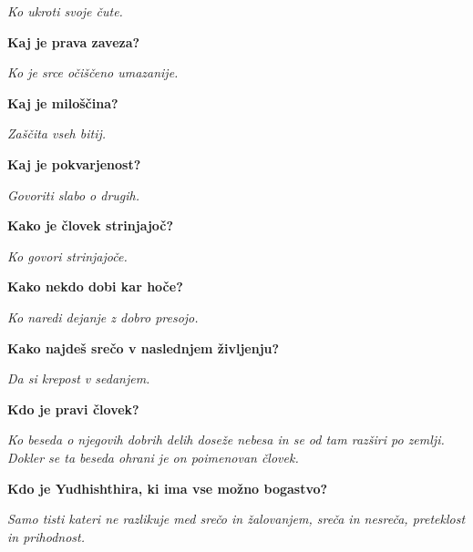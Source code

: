 \textit{Ko ukroti svoje čute.}\medskip 

\textbf{Kaj je prava zaveza?} 

\textit{Ko je srce očiščeno umazanije.}\medskip 

\textbf{Kaj je miloščina?} 

\textit{Zaščita vseh bitij.}\medskip 

\textbf{Kaj je pokvarjenost?} 

\textit{Govoriti slabo o drugih.}\medskip 

\textbf{Kako je človek strinjajoč?} 

\textit{Ko govori strinjajoče.}\medskip 

\textbf{Kako nekdo dobi kar hoče?} 

\textit{Ko naredi dejanje z dobro presojo.}\medskip 

\textbf{Kako najdeš srečo v naslednjem življenju?} 

\textit{Da si krepost v sedanjem.}\medskip 

\textbf{Kdo je pravi človek?} 

\textit{Ko beseda o njegovih dobrih delih doseže nebesa in se od tam razširi po zemlji. Dokler se ta beseda ohrani je on poimenovan človek.}\medskip 

\textbf{Kdo je Yudhishthira, ki ima vse možno bogastvo?} 

\textit{Samo tisti kateri ne razlikuje med srečo in žalovanjem, sreča in nesreča, preteklost in prihodnost.}\medskip 